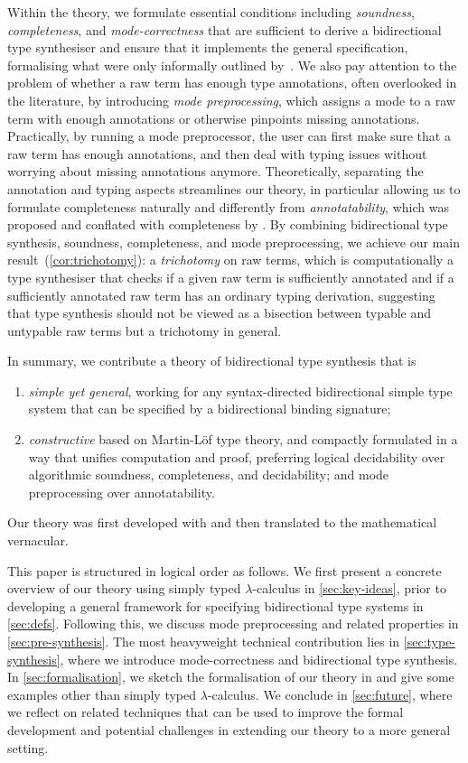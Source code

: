 Within the theory, we formulate essential conditions including \emph{soundness}, \emph{completeness}, and \emph{mode-correctness} that are sufficient to derive a bidirectional type synthesiser and ensure that it implements the general specification, formalising what were only informally outlined by~\citet{Dunfield2021}.
We also pay attention to the problem of whether a raw term has enough type annotations, often overlooked in the literature, by introducing \emph{mode preprocessing}, which assigns a mode to a raw term with enough annotations or otherwise pinpoints missing annotations.
Practically, by running a mode preprocessor, the user can first make sure that a raw term has enough annotations, and then deal with typing issues without worrying about missing annotations anymore.
Theoretically, separating the annotation and typing aspects streamlines our theory, in particular allowing us to formulate completeness naturally and differently from \emph{annotatability}, which was proposed and conflated with completeness by \citet{Dunfield2021}.
By combining bidirectional type synthesis, soundness, completeness, and mode preprocessing, we achieve our main result~(\cref{cor:trichotomy}): a \emph{trichotomy} on raw terms, which is computationally a type synthesiser that checks if a given raw term is sufficiently annotated and if a sufficiently annotated raw term has an ordinary typing derivation, suggesting that type synthesis should not be viewed as a bisection between typable and untypable raw terms but a trichotomy in general.

In summary, we contribute a theory of bidirectional type synthesis that is
\begin{enumerate}
  \item \emph{simple yet general}, working for any syntax-directed bidirectional simple type system that can be specified by a bidirectional binding signature;
  \item \emph{constructive} based on Martin-L\"of type theory, and compactly formulated in a way that unifies computation and proof, preferring logical decidability over algorithmic soundness, completeness, and decidability; and mode preprocessing over annotatability.
\end{enumerate}
Our theory was first developed with \Agda and then translated to the mathematical vernacular.

This paper is structured in logical order as follows.
We first present a concrete overview of our theory using simply typed $\lambda$-calculus in \cref{sec:key-ideas}, prior to developing a general framework for specifying bidirectional type systems in \cref{sec:defs}.
Following this, we discuss mode preprocessing and related properties in \cref{sec:pre-synthesis}.
The most heavyweight technical contribution lies in \cref{sec:type-synthesis}, where we introduce mode-correctness and bidirectional type synthesis.
In \cref{sec:formalisation}, we sketch the formalisation of our theory in \Agda and give some examples other than simply typed $\lambda$-calculus.
We conclude in \cref{sec:future}, where we reflect on related techniques that can be used to improve the formal development and potential challenges in extending our theory to a more general setting.

